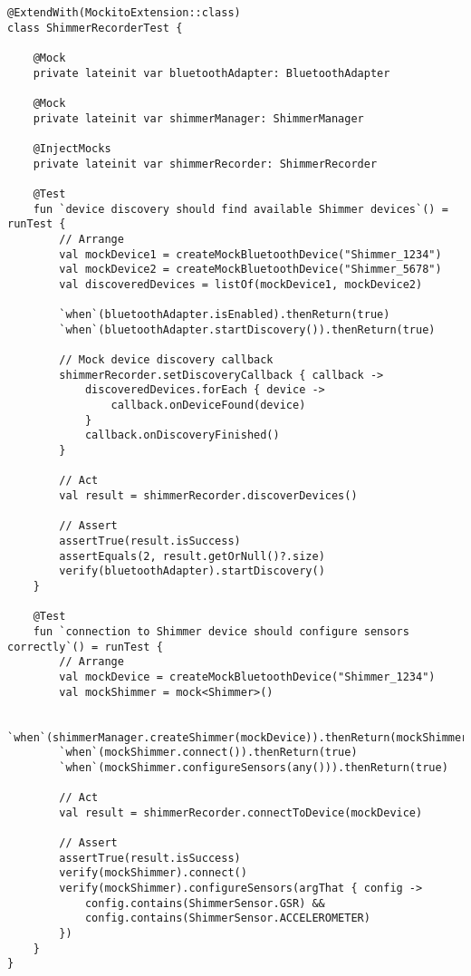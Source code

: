 \documentclass[12pt,a4paper]{article}
\begin{document}
\begin{verbatim}
@ExtendWith(MockitoExtension::class)
class ShimmerRecorderTest {
    
    @Mock
    private lateinit var bluetoothAdapter: BluetoothAdapter
    
    @Mock
    private lateinit var shimmerManager: ShimmerManager
    
    @InjectMocks
    private lateinit var shimmerRecorder: ShimmerRecorder
    
    @Test
    fun `device discovery should find available Shimmer devices`() = runTest {
        // Arrange
        val mockDevice1 = createMockBluetoothDevice("Shimmer_1234")
        val mockDevice2 = createMockBluetoothDevice("Shimmer_5678")
        val discoveredDevices = listOf(mockDevice1, mockDevice2)
        
        `when`(bluetoothAdapter.isEnabled).thenReturn(true)
        `when`(bluetoothAdapter.startDiscovery()).thenReturn(true)
        
        // Mock device discovery callback
        shimmerRecorder.setDiscoveryCallback { callback ->
            discoveredDevices.forEach { device ->
                callback.onDeviceFound(device)
            }
            callback.onDiscoveryFinished()
        }
        
        // Act
        val result = shimmerRecorder.discoverDevices()
        
        // Assert
        assertTrue(result.isSuccess)
        assertEquals(2, result.getOrNull()?.size)
        verify(bluetoothAdapter).startDiscovery()
    }
    
    @Test
    fun `connection to Shimmer device should configure sensors correctly`() = runTest {
        // Arrange
        val mockDevice = createMockBluetoothDevice("Shimmer_1234")
        val mockShimmer = mock<Shimmer>()
        
        `when`(shimmerManager.createShimmer(mockDevice)).thenReturn(mockShimmer)
        `when`(mockShimmer.connect()).thenReturn(true)
        `when`(mockShimmer.configureSensors(any())).thenReturn(true)
        
        // Act
        val result = shimmerRecorder.connectToDevice(mockDevice)
        
        // Assert
        assertTrue(result.isSuccess)
        verify(mockShimmer).connect()
        verify(mockShimmer).configureSensors(argThat { config ->
            config.contains(ShimmerSensor.GSR) && 
            config.contains(ShimmerSensor.ACCELEROMETER)
        })
    }
}
\end{verbatim}
\end{document}
